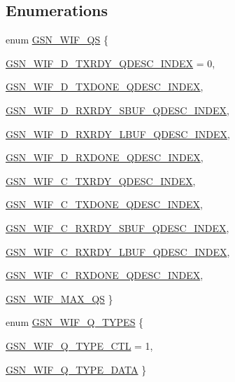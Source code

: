\subsection*{Enumerations}
\begin{DoxyCompactItemize}
\item 
enum \hyperlink{a00610_a5b8e1c6bdba07349b5bd789fe8517c61}{GSN\_\-WIF\_\-QS} \{ \par
\hyperlink{a00610_a5b8e1c6bdba07349b5bd789fe8517c61a5c8c66abd08e60202da3d9f8e4270801}{GSN\_\-WIF\_\-D\_\-TXRDY\_\-QDESC\_\-INDEX} =  0, 
\par
\hyperlink{a00610_a5b8e1c6bdba07349b5bd789fe8517c61a6e987ed002de284ea46178c563ef76aa}{GSN\_\-WIF\_\-D\_\-TXDONE\_\-QDESC\_\-INDEX}, 
\par
\hyperlink{a00610_a5b8e1c6bdba07349b5bd789fe8517c61a4cce71a50f9641c549170ac32e3291c9}{GSN\_\-WIF\_\-D\_\-RXRDY\_\-SBUF\_\-QDESC\_\-INDEX}, 
\par
\hyperlink{a00610_a5b8e1c6bdba07349b5bd789fe8517c61a07a7118d8f24d38c0c8b9cbb6df0cfd2}{GSN\_\-WIF\_\-D\_\-RXRDY\_\-LBUF\_\-QDESC\_\-INDEX}, 
\par
\hyperlink{a00610_a5b8e1c6bdba07349b5bd789fe8517c61aa3298c9b628984234d4f063edb697df9}{GSN\_\-WIF\_\-D\_\-RXDONE\_\-QDESC\_\-INDEX}, 
\par
\hyperlink{a00610_a5b8e1c6bdba07349b5bd789fe8517c61ac464a0e18929b65df95a0e6267f83eb4}{GSN\_\-WIF\_\-C\_\-TXRDY\_\-QDESC\_\-INDEX}, 
\par
\hyperlink{a00610_a5b8e1c6bdba07349b5bd789fe8517c61a07223913664f49f02e1436fd5f3ffe44}{GSN\_\-WIF\_\-C\_\-TXDONE\_\-QDESC\_\-INDEX}, 
\par
\hyperlink{a00610_a5b8e1c6bdba07349b5bd789fe8517c61a6f1d2235daf2d502c9b0fd1bfd4368fc}{GSN\_\-WIF\_\-C\_\-RXRDY\_\-SBUF\_\-QDESC\_\-INDEX}, 
\par
\hyperlink{a00610_a5b8e1c6bdba07349b5bd789fe8517c61afd202c746a2da58f35224fbcb5e5c558}{GSN\_\-WIF\_\-C\_\-RXRDY\_\-LBUF\_\-QDESC\_\-INDEX}, 
\par
\hyperlink{a00610_a5b8e1c6bdba07349b5bd789fe8517c61aa33d4c073688e3c1fdf1f305d79e1e49}{GSN\_\-WIF\_\-C\_\-RXDONE\_\-QDESC\_\-INDEX}, 
\par
\hyperlink{a00610_a5b8e1c6bdba07349b5bd789fe8517c61a9abe369d68f8b2f766e406e2f065495d}{GSN\_\-WIF\_\-MAX\_\-QS}
 \}
\item 
enum \hyperlink{a00610_abba8f1513c3343135d9334609ba7176a}{GSN\_\-WIF\_\-Q\_\-TYPES} \{ \par
\hyperlink{a00610_abba8f1513c3343135d9334609ba7176aa61955dccf6bab002433fe205c24c370d}{GSN\_\-WIF\_\-Q\_\-TYPE\_\-CTL} =  1, 
\par
\hyperlink{a00610_abba8f1513c3343135d9334609ba7176aab0f73b73e52c44915fbc8381a4efd091}{GSN\_\-WIF\_\-Q\_\-TYPE\_\-DATA}
 \}
\end{DoxyCompactItemize}


